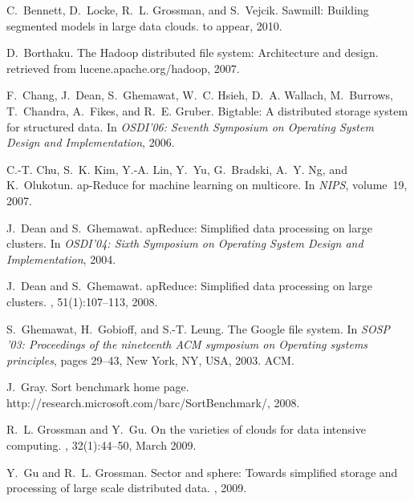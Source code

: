 \documentclass{acm_proc_article-sp}
\begin{document}
\begin{thebibliography}{10}

C.~Bennett, D.~Locke, R.~L. Grossman, and S.~Vejcik.
\newblock Sawmill: Building segmented models in large data clouds.
\newblock to appear, 2010.

D.~Borthaku.
\newblock The {H}adoop distributed file system: Architecture and design.
\newblock retrieved from lucene.apache.org/hadoop, 2007.

F.~Chang, J.~Dean, S.~Ghemawat, W.~C. Hsieh, D.~A. Wallach, M.~Burrows,
  T.~Chandra, A.~Fikes, and R.~E. Gruber.
\newblock Bigtable: A distributed storage system for structured data.
\newblock In {\em OSDI'06: Seventh Symposium on Operating System Design and
  Implementation}, 2006.

C.-T. Chu, S.~K. Kim, Y.-A. Lin, Y.~Yu, G.~Bradski, A.~Y. Ng, and K.~Olukotun.
ap-{R}educe for machine learning on multicore.
\newblock In {\em NIPS}, volume~19, 2007.

J.~Dean and S.~Ghemawat.
ap{R}educe: Simplified data processing on large clusters.
\newblock In {\em OSDI'04: Sixth Symposium on Operating System Design and
  Implementation}, 2004.

J.~Dean and S.~Ghemawat.
ap{R}educe: Simplified data processing on large clusters.
, 51(1):107--113, 2008.


\vfill\eject


S.~Ghemawat, H.~Gobioff, and S.-T. Leung.
\newblock The {G}oogle file system.
\newblock In {\em SOSP '03: Proceedings of the nineteenth ACM symposium on
  Operating systems principles}, pages 29--43, New York, NY, USA, 2003. ACM.

J.~Gray.
\newblock Sort benchmark home page.
\newblock http://research.microsoft.com/barc/SortBenchmark/, 2008.

R.~L. Grossman and Y.~Gu.
\newblock On the varieties of clouds for data intensive computing.
,
  32(1):44--50, March 2009.

Y.~Gu and R.~L. Grossman.
\newblock Sector and sphere: Towards simplified storage and processing of large
  scale distributed data.
, 2009.


\end{thebibliography}
\end{document}
